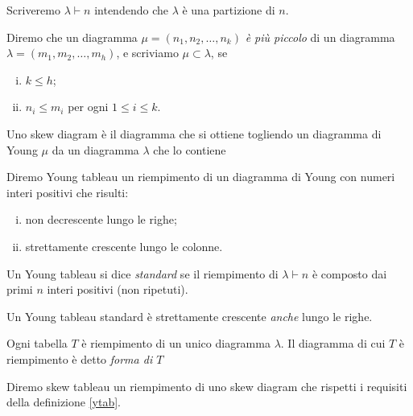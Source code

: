 \begin{notaz}
Scriveremo $\lambda \vdash n$ intendendo che $\lambda$ \`e una
partizione di $n$.
\end{notaz}

Diremo che un diagramma $\mu=(n_1,n_2,\dots,n_k)$ \emph{\`e pi\`u
piccolo} di un diagramma $\lambda=(m_1,m_2,\dots,m_h)$, e scriviamo
$\mu \subset \lambda$, se

\begin{enumerate}[(i)]
\item $k \leq h$;
\item $n_i \leq m_i$ per ogni $1 \leq i \leq k$.
\end{enumerate}

\begin{defn}
Uno skew diagram \`e il diagramma che si ottiene togliendo un
diagramma di Young $\mu$ da un diagramma $\lambda$ che lo contiene
\end{defn}

\begin{defn}\label{ytab}
Diremo Young tableau un riempimento di un diagramma di Young con
numeri interi positivi che risulti:
\begin{enumerate}[(i)]
\item non decrescente lungo le righe;
\item strettamente crescente lungo le colonne.
\end{enumerate}
Un Young tableau si dice \emph{standard} se il riempimento di
$\lambda \vdash n$ \`e composto dai primi $n$ interi positivi (non
ripetuti).
\end{defn}

\begin{oss}
Un Young tableau standard \`e strettamente crescente \emph{anche}
lungo le righe.
\end{oss}

\begin{oss}
Ogni tabella $T$ \`e riempimento di un unico diagramma $\lambda$. Il
diagramma di cui $T$ \`e riempimento \`e detto \emph{forma di $T$}
\end{oss}

\begin{defn}
Diremo skew tableau un riempimento di uno skew diagram che rispetti i
requisiti della definizione \ref{ytab}. 
\end{defn}

